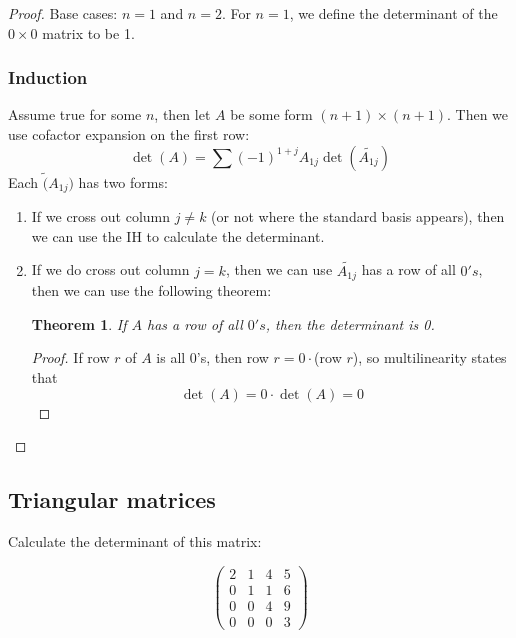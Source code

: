 \documentclass{article}
\newtheorem{theorem}{Theorem}[section]
\newtheorem{one minute paper}[theorem]{One Minute Paper}
\begin{document}
\begin{proof}
    Base cases: $n = 1$ and $n = 2$. For $n = 1$, we define the determinant of the $0 \times 0$ matrix to be 1. 

    \subsubsection*{Induction}

    Assume true for some $n$, then let $A$ be some form $(n + 1) \times (n + 1)$. Then we use cofactor expansion on the first row:
    \begin{equation}
        \det(A) = \sum (-1)^{1 + j}A_{1j}\det(\tilde{A_{1j}})
    \end{equation}
    Each $\tilde(A_{1j})$ has two forms:
    \begin{enumerate}
        \item If we cross out column $j \neq k$ (or not where the standard basis appears), then we can use the IH to calculate the determinant. 
        \item If we do cross out column $j = k$, then we can use $\tilde{A_{1j}}$ has a row of all $0's$, then we can use the following theorem:
        \begin{theorem}
            If $A$ has a row of all $0's$, then the determinant is 0. 
        \end{theorem}
        \begin{proof}
            If row $r$ of $A$ is all 0's, then row $r = 0 \cdot $(row $r$), so multilinearity states that 
            \begin{equation}
                \det(A) = 0\cdot \det(A) = 0
            \end{equation} 
        \end{proof}
    \end{enumerate}
\end{proof}

\subsection*{Triangular matrices}

Calculate the determinant of this matrix:

\begin{equation}
    \begin{pmatrix}
        2 & 1 & 4 & 5\\
        0 & 1 & 1 & 6\\
        0 & 0 & 4 & 9\\
        0 & 0 & 0 & 3
    \end{pmatrix}
\end{equation}
\end{document}
